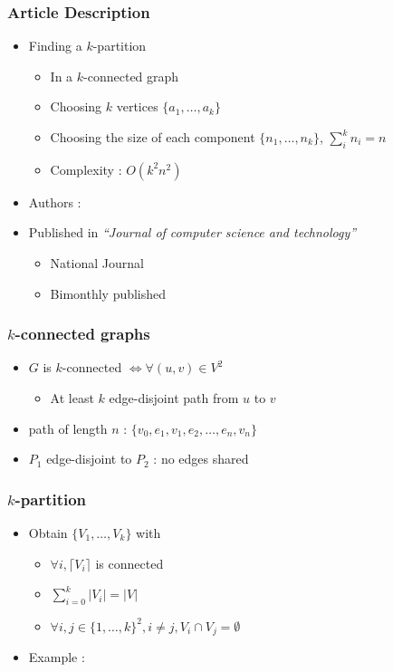 \documentclass[xcolor=dvipsnames]{beamer}
\begin{document}
\begin{frame}
  \frametitle{Article Description}
  \begin{itemize}
  \item Finding a $k$-partition
    \begin{itemize}
    \item In a $k$-connected graph
    \item Choosing $k$ vertices $\{a_1, \dots , a_k\}$
    \item Choosing the size of each component $\{n_1, \dots ,n_k\}$,
      $\sum\limits_{i}^k{n_i} = n$
    \item Complexity : $O(k^2 n^2)$
    \end{itemize}
  \item Authors :
  \item Published in {\em ``Journal of computer science and technology''}
    \begin{itemize}
    \item National Journal
    \item Bimonthly published
    \end{itemize}
  \end{itemize}
\end{frame}

\begin{frame}
  \frametitle{$k$-connected graphs}
  \begin{itemize}
    \item $G$ is $k$-connected $\Leftrightarrow \forall (u,v) \in V^2$
      \begin{itemize}
      \item At least $k$ edge-disjoint path from $u$ to $v$
      \end{itemize}
    \item path of length $n$ : $\{v_0,e_1,v_1,e_2, \dots , e_n,v_n\}$
    \item $P_1$ edge-disjoint to $P_2$ : no edges shared
  \end{itemize}
\end{frame}

\begin{frame}
  \frametitle{$k$-partition}
  \begin{itemize}
  \item Obtain $\{V_1, \dots, V_k\}$ with
    \begin{itemize}
    \item $\forall i, \lceil V_i \rceil$ is connected
    \item $\sum\limits_{i=0}^k|V_i| = |V|$
    \item $\forall i,j \in \{1, \dots, k\}^2, i \neq j, V_i \cap V_j = \emptyset$
    \end{itemize}
  \item Example :%
  \end{itemize}
\end{frame}
\end{document}
